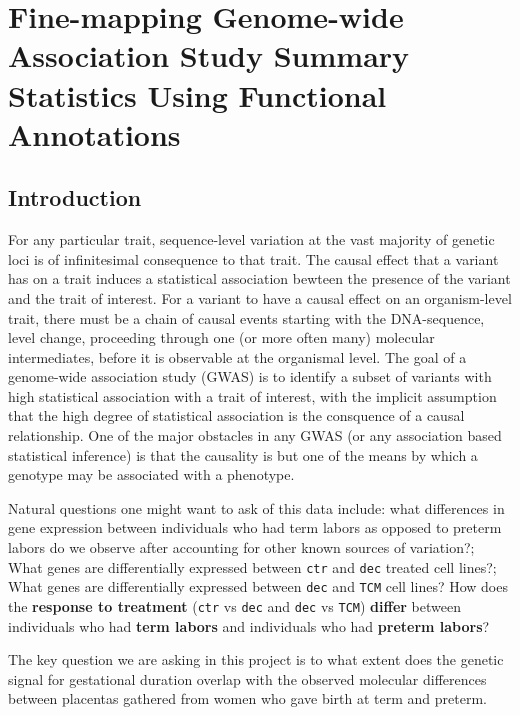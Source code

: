 \chapter{Fine-mapping Genome-wide Association Study Summary Statistics Using Functional Annotations}

\section{Introduction}\label{sec:org59556ac}

For any particular trait, sequence-level variation at the vast majority of genetic loci is of infinitesimal consequence to that trait.  The causal
effect that a variant has on a trait induces a statistical association bewteen the presence of the variant and the trait of interest.
For a variant to have a causal effect on an organism-level trait, there must be a chain of causal events starting with the DNA-sequence,
level change, proceeding through one (or more often many) molecular intermediates, before it is observable at the organismal level.
The goal of a genome-wide association study (GWAS) is to identify a subset of variants with high statistical association with a trait of interest,
with the implicit assumption that the high degree of statistical association is the consquence of a causal relationship.
One of the major obstacles in any GWAS (or any association based statistical inference) is that the causality is but one of the means by which
a genotype may be associated with a phenotype.



Natural questions one might want to ask of this data include: what differences in gene expression between individuals who had term labors as opposed to preterm labors do we observe after accounting for other known sources of variation?;
What genes are differentially expressed between \texttt{ctr} and \texttt{dec} treated cell lines?; What genes are differentially expressed between \texttt{dec} and \texttt{TCM} cell lines?
How does the \textbf{response to treatment} (\texttt{ctr} vs \texttt{dec} and \texttt{dec} vs \texttt{TCM}) \textbf{differ} between individuals who had \textbf{term labors} and individuals who had \textbf{preterm labors}?

The key question we are asking in this project is to what extent does the genetic signal for gestational duration overlap with the observed molecular differences between placentas gathered from women who gave birth at term and preterm.

